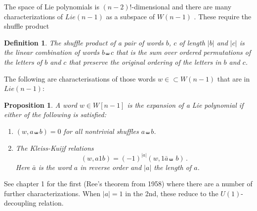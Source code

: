 \documentclass[11pt]{article}
\newcommand{\1}{{\rm 1\hskip-0.25em I}}
\newtheorem{defn}{Definition}[section]
\newtheorem{propn}{Proposition}[section]
\begin{document}
The space of Lie polynomials is $(n-2)!$-dimensional and there are many characterizations of $Lie(n-1)$ as a subspace of $W(n-1)$ \cite{Reutenauer}.  These require the shuffle product

\begin{defn}
The \emph{shuffle product} of a pair of words $b$, $c$ of length $|b|$ and $|c|$  is the  linear combination of words $b\shuffle c$ that is the sum over ordered permutations of the letters of $b$ and $c$ that preserve the original ordering of the letters in $b$ and  $c$. 
\end{defn} 

The following are characterisations of those words   $w\in\subset W(n-1)$ that are in  $Lie(n-1)$:
\begin{propn}\label{Lie-char}
A word $w\in W[n-1]$ is the expansion of a Lie polynomial if either of the following is satisfied:
\begin{enumerate}
\item $(w,a\shuffle b)=0$ for all nontrivial shuffles $a\shuffle b$.
\item The Kleiss-Kuijf relations  \cite{KK1989} 
\begin{equation}
(w, a1b)=(-1)^{|a|}(w,1\bar a\shuffle \ b)\, .
\end{equation}
Here $\bar a$ is the word $a$ in reverse order and $|a|$ the length of $a$.
\end{enumerate}

\end{propn}

See \cite{Reutenauer} chapter 1 for the first (Ree's theorem from 1958) where there are a number of further characterizations.
When $|a|=1$ in the 2nd, these reduce to the $U(1)$-decoupling relation.
\end{document}
